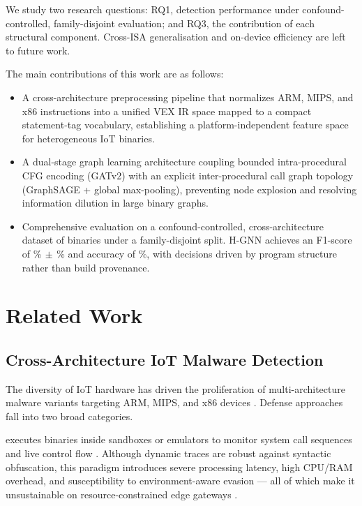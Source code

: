 \documentclass{llncs}
\begin{document}
We study two research questions: RQ1, detection performance under
confound-controlled, family-disjoint evaluation; and RQ3, the contribution
of each structural component. Cross-ISA generalisation and on-device
efficiency are left to future work.

The main contributions of this work are as follows:
\begin{itemize}
    \item {} A
    cross-architecture preprocessing pipeline that normalizes
    ARM, MIPS, and x86 instructions into a unified
    VEX IR space mapped to a compact statement-tag vocabulary, establishing
    a platform-independent feature space for heterogeneous IoT
    binaries.

    \item {}
    A dual-stage graph learning architecture coupling bounded
    intra-procedural CFG encoding (GATv2) with an explicit 
    inter-procedural call graph topology (GraphSAGE + global max-pooling),
    preventing node explosion and resolving information dilution
    in large binary graphs.

    \item {} Comprehensive
    evaluation on a confound-controlled, cross-architecture dataset of \dsTotal{} binaries under a family-disjoint split.
    H-GNN achieves an F1-score of \hgnnF\%$\,\pm\,$\hgnnFstd\% and accuracy of \hgnnAcc\%,
    with decisions driven by program structure rather than build provenance.
\end{itemize}


\section{Related Work}
\label{sec:related_work}

\subsection{Cross-Architecture IoT Malware Detection}

The diversity of IoT hardware has driven the proliferation of
multi-architecture malware variants targeting ARM, MIPS, and
x86 devices \cite{b1}. Defense approaches fall into two broad
categories.

 executes binaries inside sandboxes
or emulators to monitor system call sequences and live control
flow \cite{b3}. Although dynamic traces are robust against
syntactic obfuscation, this paradigm introduces severe
processing latency, high CPU/RAM overhead, and susceptibility
to environment-aware evasion — all of which make it
unsustainable on resource-constrained edge gateways \cite{b2}.
\end{document}
